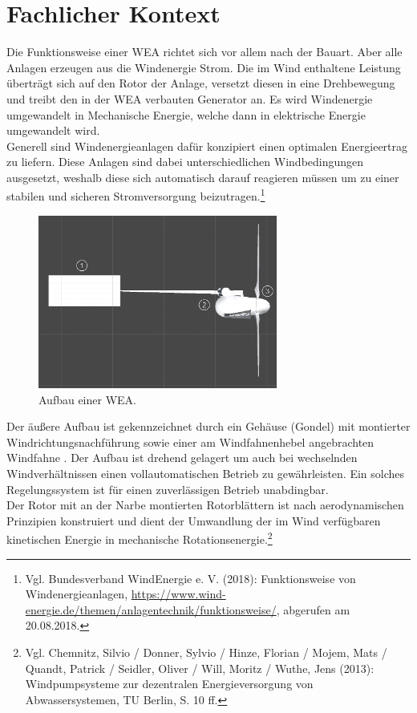 \newpage

\section{Fachlicher Kontext}
\label{sec:FachlicherKontext}
Die Funktionsweise einer WEA richtet sich vor allem nach der Bauart. Aber alle Anlagen erzeugen aus die Windenergie Strom. Die im Wind enthaltene Leistung überträgt sich auf den Rotor der Anlage, versetzt diesen in eine Drehbewegung und treibt den in der WEA verbauten Generator an. Es wird Windenergie umgewandelt in Mechanische Energie, welche dann in elektrische Energie umgewandelt wird. \\
Generell sind Windenergieanlagen dafür konzipiert einen optimalen Energieertrag zu liefern. Diese Anlagen sind dabei unterschiedlichen Windbedingungen ausgesetzt, weshalb diese sich automatisch darauf reagieren müssen um zu einer stabilen und sicheren Stromversorgung beizutragen.\footnote{Vgl. Bundesverband WindEnergie e. V.  (2018): Funktionsweise von Windenergieanlagen,\newline
\url{https://www.wind-energie.de/themen/anlagentechnik/funktionsweise/},\newline 
abgerufen am 20.08.2018.}  


\begin{figure}[H]
	\centering
	\captionsetup{width=0.7\textwidth}
	\includegraphics[keepaspectratio, width=0.7\textwidth]{bildquellen/WEA1_1}
	\caption{Aufbau einer WEA.}
	\label{fig:1}
\end{figure}

Der äußere Aufbau ist gekennzeichnet durch ein Gehäuse (Gondel) mit montierter Windrichtungsnachführung  sowie einer am Windfahnenhebel angebrachten Windfahne . Der Aufbau ist drehend gelagert um auch bei wechselnden Windverhältnissen einen vollautomatischen Betrieb zu gewährleisten. Ein solches Regelungssystem ist für einen zuverlässigen Betrieb unabdingbar. \\
Der Rotor mit an der Narbe montierten Rotorblättern  ist nach aerodynamischen Prinzipien konstruiert und dient der Umwandlung der im Wind verfügbaren kinetischen Energie in mechanische Rotationsenergie.\footnote{Vgl. Chemnitz, Silvio / Donner, Sylvio / Hinze, Florian / Mojem, Mats / Quandt, Patrick / Seidler, Oliver / Will, Moritz / Wuthe, Jens  (2013): Windpumpsysteme zur dezentralen Energieversorgung von Abwassersystemen, TU Berlin, S. 10 ff.}

